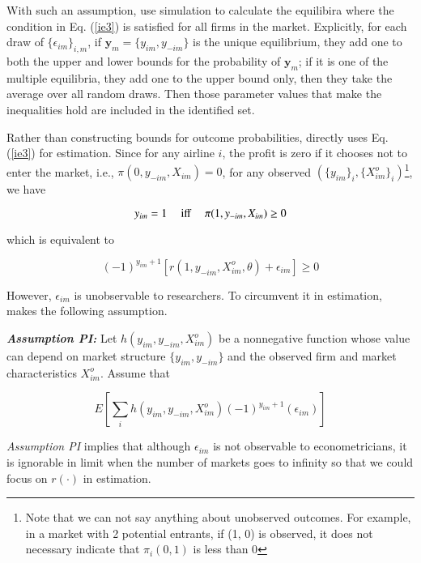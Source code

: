 \documentclass[draft]{article}
\begin{document}
With such an assumption, \cite{ciliberto2009market} use simulation to calculate the equilibira where the condition in Eq. (\ref{ie3}) is satisfied for all firms in the market. Explicitly, for each draw of $\{\epsilon_{im}\}_{i,m}$, if $\textbf{y}_m=\{y_{im}, y_{-im}\}$ is the unique equilibrium, they add one to both the upper and lower bounds for the probability of $\textbf{y}_m$; if it is one of the multiple equilibria, they add one to the upper bound only, then they take the average over all random draws. Then those parameter values that make the inequalities hold are included in the identified set. 


Rather than constructing bounds for outcome probabilities, \cite{pakes2015moment} directly uses Eq.(\ref{ie3}) for estimation. Since for any airline $i$, the profit is zero if it chooses not to enter the market, i.e., $\pi(0,y_{-im},X_{im})=0$, for any observed $(\{y_{im}\}_i, \{X^o_{im}\}_i)$\footnote{Note that we can not say anything about unobserved outcomes. For example, in a market with 2 potential entrants, if (1, 0) is observed, it does not necessary indicate that $\pi_i(0, 1)$ is less than 0}, we have


$$y_{im}=1 \mbox{ \quad iff \quad }  \pi(1,y_{-im},X_{im}) \geq 0$$


which is equivalent to 

\begin{equation}
 (-1)^{y_{im}+1}[r(1,y_{-im},X^o_{im},\theta)+ \epsilon_{im}]\geq 0
\label{rie}
\end{equation}



However, $\epsilon_{im}$ is unobservable to researchers. To circumvent it in estimation, \cite{pakes2015moment} makes the following assumption.

\bigskip
\textbf{\textit{Assumption PI:} }Let $h(y_{im},y_{-im},X^o_{im})$ be a nonnegative function whose value can depend on market structure $\{y_{im},y_{-im}\}$ and the observed firm and market characteristics $X^o_{im}$. Assume that 

\begin{equation}
E[\sum_i h(y_{im},y_{-im},X^o_{im}) (-1)^{y_{im}+1}(\epsilon_{im})]
\label{api}
\end{equation}


\bigskip

\textit{Assumption PI} implies that although $\epsilon_{im}$ is not observable to econometricians, it is ignorable in limit when the number of markets goes to infinity so that we could focus on $r(\cdot)$ in estimation.
\end{document}
